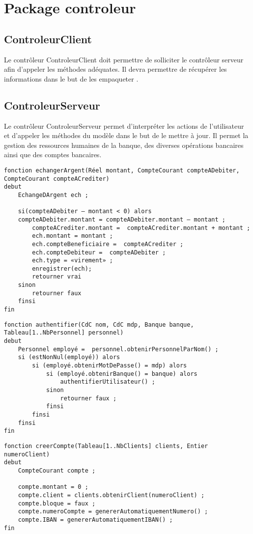 {\color{green}{Les vues seront reparties selon différentes classes, à savoir AdminR, AjoutPersonnelR, StatistiquesR,
consulterCompteR, AccueilR et EchangerR}}

\section{Package controleur}


\subsection{ControleurClient}
Le contrôleur ControleurClient doit permettre de solliciter le contrôleur serveur afin d'appeler les méthodes adéquates.
Il devra permettre de récupérer les informations dans le but de les empaqueter {\color{red}{en RMI}}
 {\color{green}{en JSON afin de récuperer ces informations en REST}}.

\subsection{ControleurServeur}
Le contrôleur ControleurServeur permet d'interpréter les actions de l'utilisateur et d'appeler les méthodes du modèle
dans le but de le mettre à jour. Il permet la gestion des ressources humaines de la banque, des diverses opérations
bancaires ainsi que des comptes bancaires.

\begin{verbatim}
fonction echangerArgent(Réel montant, CompteCourant compteADebiter, CompteCourant compteACrediter)
debut
    EchangeDArgent ech ;

    si(compteADebiter – montant < 0) alors
    compteADebiter.montant = compteADebiter.montant – montant ;
        compteACrediter.montant =  compteACrediter.montant + montant ;
        ech.montant = montant ;
        ech.compteBeneficiaire =  compteACrediter ;
        ech.compteDebiteur =  compteADebiter ;
        ech.type = «virement» ;
        enregistrer(ech);
        retourner vrai
    sinon
        retourner faux
    finsi
fin
\end{verbatim}



\begin{verbatim}
fonction authentifier(CdC nom, CdC mdp, Banque banque, Tableau[1..NbPersonnel] personnel)
debut
    Personnel employé =  personnel.obtenirPersonnelParNom() ;
    si (estNonNul(employé)) alors
        si (employé.obtenirMotDePasse() = mdp) alors
            si (employé.obtenirBanque() = banque) alors
                authentifierUtilisateur() ;
            sinon
                retourner faux ;
            finsi
        finsi
    finsi
fin
\end{verbatim}



\begin{verbatim}
fonction creerCompte(Tableau[1..NbClients] clients, Entier numeroClient)
debut
    CompteCourant compte ;

    compte.montant = 0 ;
    compte.client = clients.obtenirClient(numeroClient) ;
    compte.bloque = faux ;
    compte.numeroCompte = genererAutomatiquementNumero() ;
    compte.IBAN = genererAutomatiquementIBAN() ;
fin
\end{verbatim}

